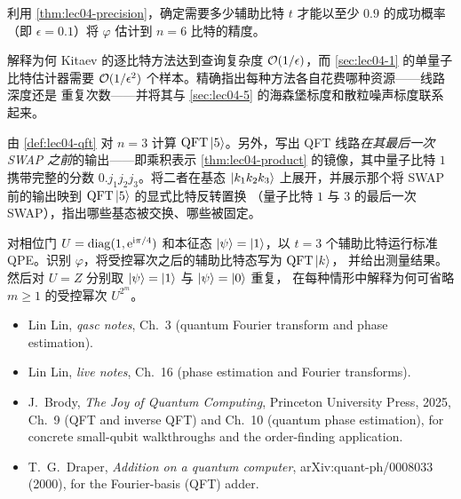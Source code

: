 \begin{exercise}\label{ex:lec04-9}
利用 \cref{thm:lec04-precision}，确定需要多少辅助比特 $t$ 才能以至少 $0.9$ 的成功概率
（即 $\epsilon=0.1$）将 $\varphi$ 估计到 $n=6$ 比特的精度。
\end{exercise}

\begin{exercise}\label{ex:lec04-10}
解释为何 Kitaev 的逐比特方法达到查询复杂度
$\mathcal{O}(1/\epsilon)$，而 \cref{sec:lec04-1} 的单量子比特估计器需要
$\mathcal{O}(1/\epsilon^{2})$ 个样本。精确指出每种方法各自花费哪种资源——线路深度还是
重复次数——并将其与 \cref{sec:lec04-5} 的海森堡标度和散粒噪声标度联系起来。
\end{exercise}

\begin{exercise}\label{ex:lec04-11}
由 \cref{def:lec04-qft} 对 $n=3$ 计算 $\mathrm{QFT}\ket{5}$。另外，写出 QFT
线路\emph{在其最后一次 SWAP 之前}的输出——即乘积表示 \cref{thm:lec04-product}
的镜像，其中量子比特 $1$ 携带完整的分数 $0.j_1 j_2 j_3$。将二者在基态
$\ket{k_1 k_2 k_3}$ 上展开，并展示那个将 SWAP 前的输出映到 $\mathrm{QFT}\ket5$ 的显式比特反转置换
（量子比特 $1$ 与 $3$ 的最后一次 SWAP），指出哪些基态被交换、哪些被固定。
\end{exercise}

\begin{exercise}\label{ex:lec04-12}
对相位门 $U=\operatorname{diag}(1,\mathrm{e}^{\mathrm{i}\pi/4})$ 和本征态 $\ket{\psi}=\ket{1}$，以 $t=3$
个辅助比特运行标准 QPE。识别 $\varphi$，将受控幂次之后的辅助比特态写为 $\mathrm{QFT}\ket{k}$，
并给出测量结果。然后对 $U=Z$ 分别取 $\ket{\psi}=\ket{1}$ 与 $\ket{\psi}=\ket{0}$ 重复，
在每种情形中解释为何可省略 $m\ge1$ 的受控幂次 $U^{2^{m}}$。
\end{exercise}

\readingsection
\begin{itemize}[leftmargin=1.4em]
  \item Lin Lin, \emph{qasc notes}, Ch.~3 (quantum Fourier transform and phase
        estimation).
  \item Lin Lin, \emph{live notes}, Ch.~16 (phase estimation and Fourier
        transforms).
  \item J.~Brody, \emph{The Joy of Quantum Computing}, Princeton University
        Press, 2025, Ch.~9 (QFT and inverse QFT) and Ch.~10 (quantum phase
        estimation), for concrete small-qubit walkthroughs and the order-finding
        application.
  \item T.~G.~Draper, \emph{Addition on a quantum computer},
        arXiv:quant-ph/0008033 (2000), for the Fourier-basis (QFT) adder.
\end{itemize}
